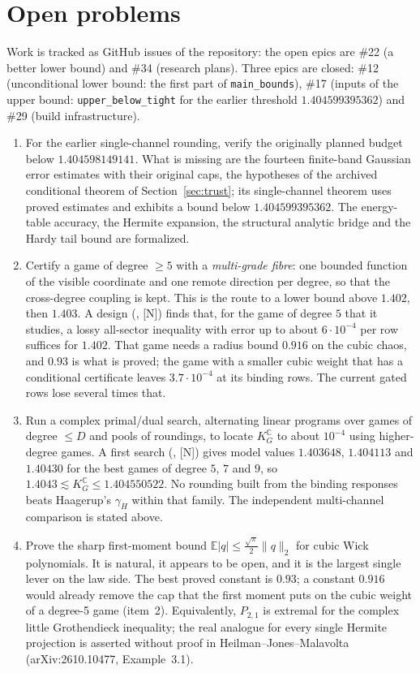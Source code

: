 \documentclass[11pt,a4paper]{article}
\newcommand{\C}{\mathbb{C}}
\newcommand{\E}{\mathbb{E}}
\newcommand{\KG}{K_G^{\C}}
\newcommand{\lean}[1]{\texttt{\small #1}}
\begin{document}
\section{Open problems}
Work is tracked as GitHub issues of the repository: the open epics are \#22 (a better lower bound) and \#34 (research
plans). Three epics are closed: \#12 (unconditional lower bound: the first part of \lean{main\_bounds}), \#17 (inputs of the upper bound:
\lean{upper\_below\_tight} for the earlier threshold $1.404599395362$) and \#29 (build infrastructure).
\begin{enumerate}
\item For the earlier single-channel rounding, verify the originally planned budget below $1.404598149141$. What is missing are the
 fourteen finite-band Gaussian error estimates with their original caps, the hypotheses of the archived conditional theorem of
 Section~\ref{sec:trust}; its single-channel theorem uses proved estimates and exhibits a bound below $1.404599395362$.
 The energy-table accuracy, the Hermite expansion, the structural analytic bridge and the Hardy tail bound are formalized.
\item Certify a game of degree $\ge5$ with a \emph{multi-grade fibre}: one bounded function of the visible coordinate and one
 remote direction per degree, so that the cross-degree coupling is kept. This is the route to a lower bound above $1.402$,
 then $1.403$. A design (, [N]) finds that, for the game of degree $5$ that it studies, a lossy
 all-sector inequality with error up to about $6\cdot10^{-4}$ per row suffices for $1.402$. That game needs a radius
 bound $0.916$ on the cubic chaos, and $0.93$ is what is proved; the game with a smaller cubic weight that has a
 conditional certificate leaves $3.7\cdot10^{-4}$ at its binding rows. The current gated rows lose several times that.
\item Run a complex primal/dual search, alternating linear programs over games of degree $\le D$ and pools of roundings, to
 locate $\KG$ to about $10^{-4}$ using higher-degree games. A first search
 (, [N]) gives model values $1.403648$, $1.404113$ and $1.40430$ for the best games of
 degree $5$, $7$ and $9$, so $1.4043\lesssim\KG\le1.404550522$. No rounding built from the binding responses
 beats Haagerup's $\gamma_H$ within that family. The independent multi-channel comparison is stated above.
\item Prove the sharp first-moment bound $\E|q|\le\frac{\sqrt\pi}{2}\|q\|_2$ for cubic Wick polynomials. It is natural, it
 appears to be open, and it is the largest single lever on the law side. The best proved constant is $0.93$; a constant
 $0.916$ would already remove the cap that the first moment puts on the cubic weight of a degree-5 game (item~2).
 Equivalently, $P_{2,1}$ is extremal for the complex
 little Grothendieck inequality; the real analogue for every single Hermite projection is asserted without proof in
 Heilman--Jones--Malavolta (arXiv:2610.10477, Example~3.1).
\end{enumerate}
\end{document}
